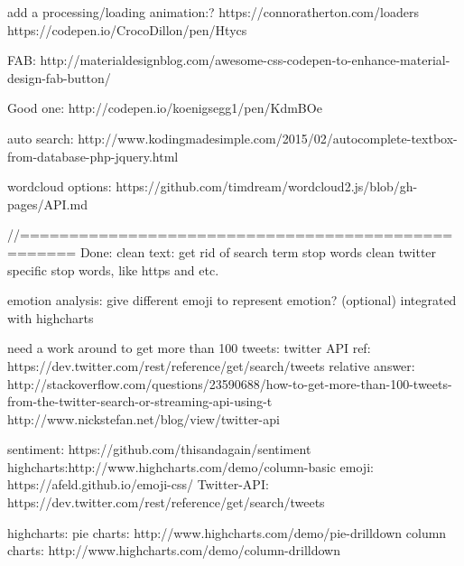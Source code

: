 add a processing/loading animation:?
https://connoratherton.com/loaders
https://codepen.io/CrocoDillon/pen/Htycs

FAB:
http://materialdesignblog.com/awesome-css-codepen-to-enhance-material-design-fab-button/

Good one:
http://codepen.io/koenigsegg1/pen/KdmBOe


auto search:
http://www.kodingmadesimple.com/2015/02/autocomplete-textbox-from-database-php-jquery.html

wordcloud options:
https://github.com/timdream/wordcloud2.js/blob/gh-pages/API.md


//===================================================
Done:
clean text:
get rid of search term
stop words
clean twitter specific stop words, like https and etc.

emotion analysis:
give different emoji to represent emotion? (optional)
integrated with highcharts

need a work around to get more than 100 tweets:
twitter API ref: https://dev.twitter.com/rest/reference/get/search/tweets
relative answer: http://stackoverflow.com/questions/23590688/how-to-get-more-than-100-tweets-from-the-twitter-search-or-streaming-api-using-t
http://www.nickstefan.net/blog/view/twitter-api


sentiment: https://github.com/thisandagain/sentiment
highcharts:http://www.highcharts.com/demo/column-basic
emoji: https://afeld.github.io/emoji-css/
Twitter-API: https://dev.twitter.com/rest/reference/get/search/tweets

highcharts:
pie charts:  http://www.highcharts.com/demo/pie-drilldown
column charts: http://www.highcharts.com/demo/column-drilldown
